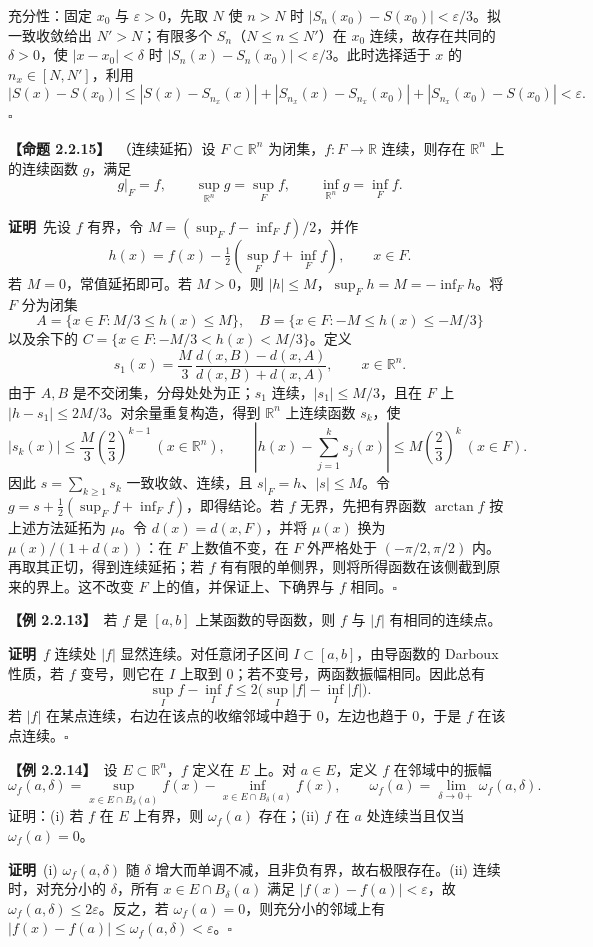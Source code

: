 \documentclass[UTF8,a4paper,11pt]{ctexart}
\newcommand{\ex}[1]{\par\medskip\noindent\textbf{【例 #1】}\ }
\newcommand{\prop}[1]{\par\medskip\noindent\textbf{【命题 #1】}\ }
\newcommand{\pf}{\par\noindent\textbf{证明}\ }
\begin{document}
充分性：固定 $x_0$ 与 $\varepsilon>0$，先取 $N$ 使 $n>N$ 时 $|S_n(x_0)-S(x_0)|<\varepsilon/3$。拟一致收敛给出 $N'>N$；有限多个 $S_n$（$N\le n\le N'$）在 $x_0$ 连续，故存在共同的 $\delta>0$，使 $|x-x_0|<\delta$ 时 $|S_n(x)-S_n(x_0)|<\varepsilon/3$。此时选择适于 $x$ 的 $n_x\in[N,N']$，利用
\[
|S(x)-S(x_0)|\le |S(x)-S_{n_x}(x)|+|S_{n_x}(x)-S_{n_x}(x_0)|+|S_{n_x}(x_0)-S(x_0)|<\varepsilon.
\]\hfill$\square$

\prop{2.2.15}（连续延拓）设 $F\subset\mathbb R^n$ 为闭集，$f:F\to\mathbb R$ 连续，则存在 $\mathbb R^n$ 上的连续函数 $g$，满足
\[
g|_F=f,\qquad \sup_{\mathbb R^n}g=\sup_F f,\qquad \inf_{\mathbb R^n}g=\inf_F f.
\]
\pf 先设 $f$ 有界，令 $M=(\sup_F f-\inf_F f)/2$，并作
\[
h(x)=f(x)-\tfrac12(\sup_Ff+\inf_Ff),\qquad x\in F.
\]
若 $M=0$，常值延拓即可。若 $M>0$，则 $|h|\le M$，$\sup_Fh=M=-\inf_Fh$。将 $F$ 分为闭集
\[
A=\{x\in F:M/3\le h(x)\le M\},\quad
B=\{x\in F:-M\le h(x)\le-M/3\}
\]
以及余下的 $C=\{x\in F:-M/3<h(x)<M/3\}$。定义
\[
s_1(x)=\frac M3\,\frac{d(x,B)-d(x,A)}{d(x,B)+d(x,A)},\qquad x\in\mathbb R^n.
\]
由于 $A,B$ 是不交闭集，分母处处为正；$s_1$ 连续，$|s_1|\le M/3$，且在 $F$ 上 $|h-s_1|\le2M/3$。对余量重复构造，得到 $\mathbb R^n$ 上连续函数 $s_k$，使
\[
|s_k(x)|\le \frac M3\left(\frac23\right)^{k-1}\ (x\in\mathbb R^n),\qquad
\left|h(x)-\sum_{j=1}^ks_j(x)\right|\le M\left(\frac23\right)^k\ (x\in F).
\]
因此 $s=\sum_{k\ge1}s_k$ 一致收敛、连续，且 $s|_F=h$、$|s|\le M$。令 $g=s+\tfrac12(\sup_Ff+\inf_Ff)$，即得结论。若 $f$ 无界，先把有界函数 $\arctan f$ 按上述方法延拓为 $\mu$。令 $d(x)=d(x,F)$，并将 $\mu(x)$ 换为 $\mu(x)/(1+d(x))$：在 $F$ 上数值不变，在 $F$ 外严格处于 $(-\pi/2,\pi/2)$ 内。再取其正切，得到连续延拓；若 $f$ 有有限的单侧界，则将所得函数在该侧截到原来的界上。这不改变 $F$ 上的值，并保证上、下确界与 $f$ 相同。\hfill$\square$

\ex{2.2.13}若 $f$ 是 $[a,b]$ 上某函数的导函数，则 $f$ 与 $|f|$ 有相同的连续点。
\pf $f$ 连续处 $|f|$ 显然连续。对任意闭子区间 $I\subset[a,b]$，由导函数的 Darboux 性质，若 $f$ 变号，则它在 $I$ 上取到 $0$；若不变号，两函数振幅相同。因此总有
\[
\sup_I f-\inf_I f\le 2\bigl(\sup_I|f|-\inf_I|f|\bigr).
\]
若 $|f|$ 在某点连续，右边在该点的收缩邻域中趋于 $0$，左边也趋于 $0$，于是 $f$ 在该点连续。\hfill$\square$

\ex{2.2.14}设 $E\subset\mathbb R^n$，$f$ 定义在 $E$ 上。对 $a\in E$，定义 $f$ 在邻域中的振幅
\[
\omega_f(a,\delta)=\sup_{x\in E\cap B_\delta(a)}f(x)-\inf_{x\in E\cap B_\delta(a)}f(x),\qquad
\omega_f(a)=\lim_{\delta\to0+}\omega_f(a,\delta).
\]
证明：(i) 若 $f$ 在 $E$ 上有界，则 $\omega_f(a)$ 存在；(ii) $f$ 在 $a$ 处连续当且仅当 $\omega_f(a)=0$。
\pf (i) $\omega_f(a,\delta)$ 随 $\delta$ 增大而单调不减，且非负有界，故右极限存在。(ii) 连续时，对充分小的 $\delta$，所有 $x\in E\cap B_\delta(a)$ 满足 $|f(x)-f(a)|<\varepsilon$，故 $\omega_f(a,\delta)\le2\varepsilon$。反之，若 $\omega_f(a)=0$，则充分小的邻域上有 $|f(x)-f(a)|\le\omega_f(a,\delta)<\varepsilon$。\hfill$\square$
\end{document}
